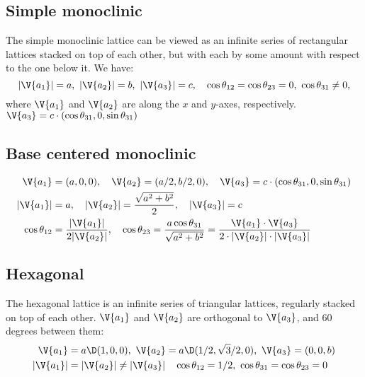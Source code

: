 \documentclass[main.tex]{subfiles}
\begin{document}
	
	\subsection*{Simple monoclinic}
	The simple monoclinic lattice can be viewed as an infinite series of rectangular lattices stacked on top of each other, but with each by some amount with respect to the one below it. We have:
	\begin{equation*}
		|\V{a_1}| = a,\ |\V{a_2}| = b,\ |\V{a_3}| = c, \quad \cos \theta_{12} = \cos \theta_{23} = 0, \ \cos \theta_{31} \neq 0,
	\end{equation*}
	where $\V{a_1}$ and $\V{a_2}$ are along the $ x $ and $ y $-axes, respectively. $\V{a_3} = c \cdot (\cos \theta_{31},0,\sin \theta_{31})$
	
	\subsection*{Base centered monoclinic}
	\begin{align*}
	\V{a_1} &= (a,0,0),\quad \V{a_2} =(a/2, b/2,0),\quad \V{a_3} = c \cdot (\cos \theta_{31},0,\sin \theta_{31}) \\
	|\V{a_1}| &= a,\quad |\V{a_2}| = \frac{\sqrt{a^2+b^2}}{2}, \quad |\V{a_3}| = c \\
	\cos \theta_{12} &= \frac{|\V{a_1}|}{2|\V{a_2}|}, \quad	\cos \theta_{23} = \frac{a\cos\theta_{31}}{\sqrt{a^2+b^2}} = \frac{\V{a_1} \cdot \V{a_3}}{2 \cdot |\V{a_2}| \cdot |\V{a_3}|}
	\end{align*}
	
	
	\subsection*{Hexagonal}
	The hexagonal lattice is an infinite series of triangular lattices, regularly stacked on top of each other. $\V{a_1}$ and $\V{a_2}$ are orthogonal to $\V{a_3}$, and 60 degrees between them:
	\begin{align*}
		\V{a_1} &= a \D (1,0,0),\ \V{a_2} = a \D (1/2,\sqrt{3}/2,0),\ \V{a_3} = (0,0,b) \\
		|\V{a_1}| &= |\V{a_2}| \neq |\V{a_3}| \quad \cos \theta_{12} = 1/2, \ \cos \theta_{31} = \cos \theta_{23} = 0
	\end{align*}
	
\end{document}
